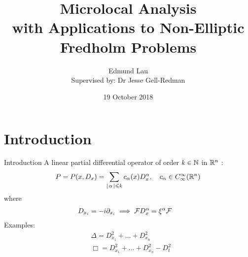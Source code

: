 \documentclass{beamer}
\title{Microlocal Analysis \\ 
    \large with Applications to Non-Elliptic Fredholm Problems}
\author{Edmund Lau \\
Supervised by: Dr Jesse Gell-Redman}
\institute[Unimelb] {
    The University of Melbourne \\ %
    \medskip
    \textit{elau1@student.unimelb.edu.au} %
}
\date{19 October 2018}
\begin{document}
    
\begin{frame}
\titlepage 
\end{frame}






\section*{Introduction} 
\begin{frame}{Introduction}
A linear partial differential operator of order $k \in {\ensuremath {\mathbb N}}$ in ${\mathbb R}^n$ : 
\begin{equation*}
P = P(x, D_x) = \sum_{\left|\, \alpha\,\right| \leqslant k} c_\alpha(x) D^\alpha_x , \quad c_\alpha \in C^\infty_\infty({\mathbb R}^n)
\end{equation*}
where 
\begin{align*}
D_{x_i} &= -i \partial_{x_i} \implies {\ensuremath {\cal F}} D_{x}^\alpha = \xi^\alpha {\ensuremath {\cal F}} 
\end{align*}
Examples: 
\begin{align*}
&\Delta = D_{x_1}^2  + \dots + D_{x_n}^2  \tag*{Laplace operator} \\
&\Box  = D_{x_1}^2  + \dots + D_{x_n}^2 - D_{t}^2    \tag*{Wave operator} 
\end{align*}
\end{frame} 
\end{document}
